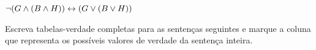 \begin{compactlist}
\item $\neg(G \wedge (B \wedge H)) \leftrightarrow (G \vee (B \vee H))$
%


\end{compactlist}

\problempart
Escreva tabelas-verdade completas para as sentenças seguintes e marque a coluna que representa os possíveis valores de verdade da sentença inteira.


